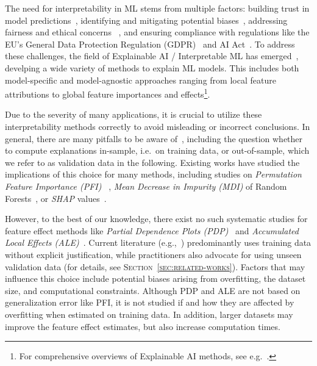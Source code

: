 \documentclass[runningheads]{llncs}
\begin{document}
The need for interpretability in ML stems from multiple factors: building trust in
model predictions~\cite{ribeiro_why_2016,teach_analysis_1981},  identifying and mitigating
potential biases~\cite{guidotti_survey_2019}, addressing fairness and ethical concerns
~\cite{lipton_mythos_2018}, and ensuring compliance with regulations like the
EU's General Data Protection Regulation (GDPR)~\cite{gdpr2016} and AI
Act~\cite{euaia2024}. To address these challenges, the field of Explainable AI
/ Interpretable ML has emerged~\cite{adadi_peeking_2018}, develping a
wide variety of methods to explain ML models. This includes both model-specific and
model-agnostic approaches ranging from local feature attributions to global
feature importances and effects\footnote{For comprehensive overviews of Explainable AI
    methods, see
    e.g.~\cite{adadi_peeking_2018,kamath_introduction_2021,molnar_interpretable_2022}.}.

Due to the severity of many applications, it is crucial to utilize these
interpretability methods correctly to avoid misleading or incorrect conclusions.
In general, there are many pitfalls to be aware of~\cite{molnar_general_2022},
including the question whether to compute explanations in-sample, i.e.\ on training data, or
out-of-sample, which we refer to as validation data in the following. Existing
works have studied the implications of this choice for many methods, including
studies on \textit{Permutation Feature Importance (PFI) }~\cite{molnar_general_2022},
\textit{Mean Decrease in Impurity (MDI)} of
Random Forests~\cite{loecher_debiasing_2022}, or \textit{SHAP}
values~\cite{loecher_debiasing_2024}.

However, to the best of our knowledge, there exist no such systematic studies
for feature effect methods like \textit{Partial Dependence Plots
    (PDP)}~\cite{friedman_greedy_2001} and \textit{Accumulated Local Effects
    (ALE)}~\cite{apley_visualizing_2020}. Current literature
(e.g.,~\cite{apley_visualizing_2020,friedman_greedy_2001,molnar_interpretable_2022})
predominantly uses training data without explicit justification, while
practitioners also advocate for using unseen validation data (for details, see
\textsc{Section~\ref{sec:related-works}}). Factors that may influence this
choice include potential biases arising from overfitting, the dataset size, and
computational constraints. Although PDP and ALE are not based on generalization
error like PFI, it is not studied if and how they are affected by overfitting
when estimated on training data. In addition, larger datasets may improve the
feature effect estimates, but also increase computation times.\\
\end{document}
